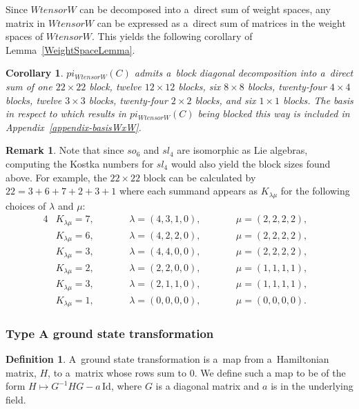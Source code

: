 \documentclass[10pt,a4paper]{amsart}
\numberwithin{equation}{section}
\newtheorem{Corollary}[Theorem]{Corollary}
\theoremstyle{definition}
\newtheorem{Definition}[Theorem]{Definition}
\newtheorem{Remark}[Theorem]{Remark}
\def\mathfrak#1{#1}
\def\pi{pi}
\def\otimes{ tensor }
\begin{document}
Since $W \otimes W$ can be decomposed into a~direct sum of weight spaces, any matrix in $W \otimes W$ can be expressed as a~direct sum of matrices in the weight spaces of $W \otimes W$. This yields the following corollary of Lemma~\ref{WeightSpaceLemma}.

\begin{Corollary}
 $\pi_{W \otimes W}(C)$ admits a~block diagonal decomposition into a~direct sum of one $22 \times 22$ block, twelve $12 \times 12$ blocks, six $8 \times 8$ blocks, twenty-four $4 \times 4$ blocks, twelve $3 \times 3$ blocks, twenty-four $2 \times 2$ blocks, and six $1 \times 1$ blocks. The basis in respect to which results in $\pi_{W \otimes W}(C)$ being blocked this way is included in Appendix~{\rm \ref{appendix-basisWxW}}.
\end{Corollary}

\begin{Remark}
Note that since $\mathfrak{so}_6$ and $\mathfrak{sl}_4$ are isomorphic as Lie algebras, computing the Kostka numbers for $\mathfrak{sl}_4$ would also yield the block sizes found above. For example, the $22\times 22$ block can be calculated by $22=3+6+7+2+3+1$ where each summand appears as $K_{\lambda\mu}$ for the following choices of $\lambda$ and $\mu$:
\begin{alignat*}{4}
&K_{\lambda\mu} = 7,  \qquad&& \lambda = (4,3,1,0), \qquad&&\mu = (2,2,2,2),&\\
&K_{\lambda\mu} = 6, \qquad&& \lambda = (4,2,2,0),\qquad&& \mu = (2,2,2,2),& \\
&K_{\lambda\mu} = 3, \qquad&& \lambda = (4,4,0,0),\qquad&& \mu = (2,2,2,2),& \\
&K_{\lambda\mu} = 2, \qquad&& \lambda = (2,2,0,0),\qquad&& \mu = (1,1,1,1),& \\
&K_{\lambda\mu} = 3, \qquad&& \lambda = (2,1,1,0),\qquad&& \mu = (1,1,1,1),& \\
&K_{\lambda\mu} = 1, \qquad&& \lambda = (0,0,0,0),\qquad&& \mu = (0,0,0,0).&
\end{alignat*}
\end{Remark}

\subsubsection[Type A ground state transformation]{Type A ground state transformation}
\begin{Definition}
 \label{defn-groundstate}
 A~ground state transformation is a~map from a~Hamiltonian matrix, $H$, to a~matrix whose rows sum to $0$.
We define such a map to be of the form $H \mapsto G^{-1}HG -a\, \mathrm{Id}$, where
$G$ is a diagonal matrix and $a$ is in the underlying field.
\end{Definition}
\end{document}
